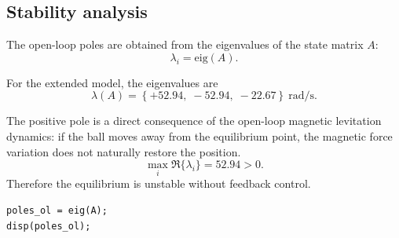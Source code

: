 \subsection{Stability analysis}

The open-loop poles are obtained from the eigenvalues of the state matrix $A$:
\begin{equation}
    \lambda_i = \mathrm{eig}(A).
\end{equation}

For the extended model, the eigenvalues are
\begin{equation}
    \lambda(A) =
    \left\{
        +52.94,\;
        -52.94,\;
        -22.67
    \right\}\ \mathrm{rad/s}.
    \label{eq:open_loop_poles}
\end{equation}


The positive pole is a direct consequence of the
open-loop magnetic levitation dynamics: if the ball moves away from the equilibrium point, the
magnetic force variation does not naturally restore the position.
\begin{equation}
    \max_i \Re\{\lambda_i\} = 52.94 > 0.
\end{equation}
Therefore the equilibrium is unstable without feedback control.

\begin{lstlisting}[style=matlabstyle,caption={Open-loop pole computation in MATLAB.}]
poles_ol = eig(A);
disp(poles_ol);
\end{lstlisting}
